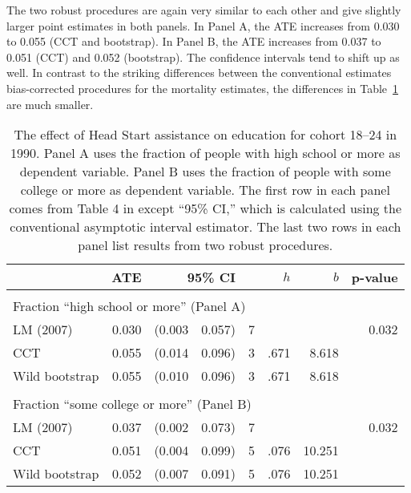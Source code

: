 \documentclass[12pt,fleqn]{article}
\begin{document}
The two robust procedures are again very similar to each other and give slightly
larger point estimates in both panels. In Panel A, the ATE increases from 0.030
to 0.055 (CCT and bootstrap). In Panel B, the ATE increases from 0.037
to 0.051 (CCT) and 0.052 (bootstrap). The confidence intervals tend to shift up
as well.  In contrast to the striking differences between the conventional
estimates bias-corrected procedures for the mortality estimates, the differences
in Table~\ref{tbl:3} are much smaller.

\begin{table}[t]
  \centering
  \begin{tabular}{lrr@{, }rr@{}rrr}
    \toprule
                   & ATE   & \multicolumn{2}{r}{95\% CI} & & $h$     & $b$ & p-value     \\
    \midrule                                                                          \\
    \multicolumn{5}{l}{Fraction ``high school or more'' (Panel A)}                    \\
    \midrule
    LM (2007)      & 0.030 & (0.003                      & 0.057) & 7&     &  & 0.032    \\
    CCT            & 0.055 & (0.014                      & 0.096) & 3&.671 & 8.618       \\
    Wild bootstrap & 0.055 & (0.010                      & 0.096) & 3&.671 & 8.618       \\\\
    \multicolumn{5}{l}{Fraction ``some college or more'' (Panel B)}                   \\
    \midrule
    LM (2007)      & 0.037 & (0.002                      & 0.073) & 7&     &  & 0.032 \T \\
    CCT            & 0.051 & (0.004                      & 0.099) & 5&.076 & 10.251      \\
    Wild bootstrap & 0.052 & (0.007                      & 0.091) & 5&.076 & 10.251      \\
    \bottomrule
  \end{tabular}
  \caption{The effect of Head Start assistance on education for cohort
    18--24 in 1990. Panel A uses the fraction of people with high school
    or more as dependent variable. Panel B uses the fraction of people
    with some college or more as dependent variable. The first row in
    each panel comes from Table 4 in \cite{ludwig2007} except ``95\% CI,''
    which is calculated using the conventional asymptotic interval estimator.
    The last two rows in
    each panel list results from two robust procedures.}
  \label{tbl:3}
\end{table}
\end{document}
